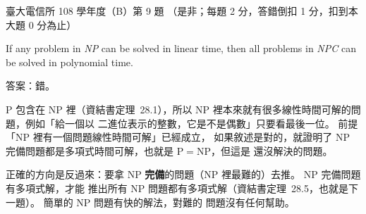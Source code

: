 \begin{pastexam}[label={px:ntu-108-comm-dsab-09}]{臺大電信所 108 學年度（B）第 9 題}
（是非；每題 2 分，答錯倒扣 1 分，扣到本大題 0 分為止）

If any problem in \textit{NP} can be solved in linear time, then all problems in \textit{NPC} can be
solved in polynomial time.
\end{pastexam}

\begin{pastsoln}
答案：錯。

P 包含在 NP 裡（資結書定理~28.1），所以 NP 裡本來就有很多線性時間可解的問題，例如「給一個以
二進位表示的整數，它是不是偶數」只要看最後一位。 前提「NP 裡有一個問題線性時間可解」已經成立，
如果敘述是對的，就證明了 NP 完備問題都是多項式時間可解，也就是 $\mathrm{P} = \mathrm{NP}$，但這是
還沒解決的問題。

正確的方向是反過來：要拿 NP \textbf{完備}的問題（NP 裡最難的）去推。 NP 完備問題有多項式解，才能
推出所有 NP 問題都有多項式解（資結書定理~28.5，也就是下一題）。 簡單的 NP 問題有快的解法，對難的
問題沒有任何幫助。
\end{pastsoln}
